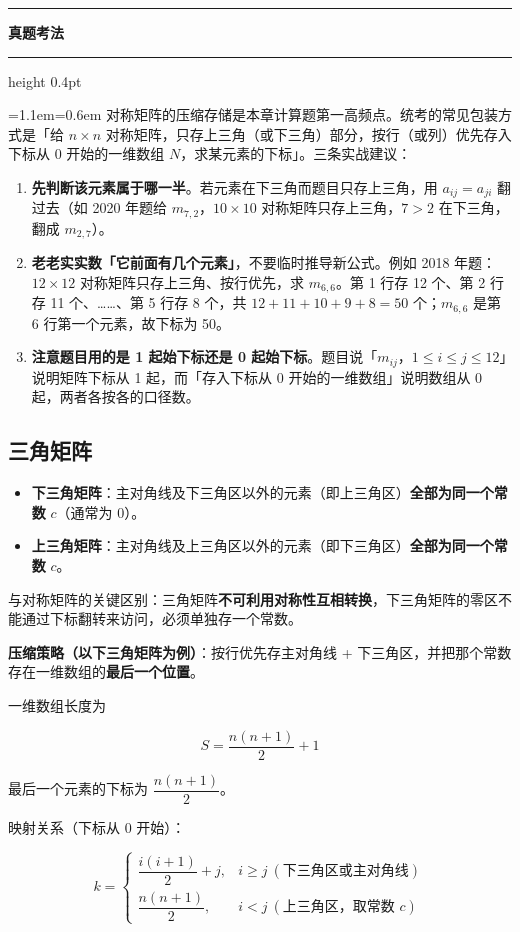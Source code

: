 \documentclass[11pt,openany,UTF8]{ctexbook}
\newcommand{\callouthead}[2]{%
  \par\addvspace{7pt}\noindent
  {\color{#1}\rule[-0.15em]{3pt}{1.05em}}\hspace{0.5em}%
  {\bfseries\color{#1}#2}\par\nobreak\vspace{-0.35em}%
  {\color{rulesep}\hrule height 0.4pt}\nobreak\vspace{0.45em}%
  \begingroup\small\setlength{\parindent}{0pt}%
  \leftskip=1.1em\rightskip=0.6em\noindent\ignorespaces}
\newcommand{\calloutend}{\par\endgroup\addvspace{7pt}}
\newenvironment{callexam}[1]{\callouthead{exambar}{#1}}{\calloutend}
\begin{document}
\begin{callexam}{真题考法}
对称矩阵的压缩存储是本章计算题第一高频点。统考的常见包装方式是「给 $n \times n$ 对称矩阵，只存上三角（或下三角）部分，按行（或列）优先存入下标从 0 开始的一维数组 $N$，求某元素的下标」。三条实战建议：

\begin{enumerate}
\item \textbf{先判断该元素属于哪一半}。若元素在下三角而题目只存上三角，用 $a_{ij} = a_{ji}$ 翻过去（如 2020 年题给 $m_{7,2}$，$10 \times 10$ 对称矩阵只存上三角，$7 > 2$ 在下三角，翻成 $m_{2,7}$）。
\item \textbf{老老实实数「它前面有几个元素」}，不要临时推导新公式。例如 2018 年题：$12 \times 12$ 对称矩阵只存上三角、按行优先，求 $m_{6,6}$。第 1 行存 12 个、第 2 行存 11 个、……、第 5 行存 8 个，共 $12+11+10+9+8 = 50$ 个；$m_{6,6}$ 是第 6 行第一个元素，故下标为 50。
\item \textbf{注意题目用的是 1 起始下标还是 0 起始下标}。题目说「$m_{ij}$，$1 \le i \le j \le 12$」说明矩阵下标从 1 起，而「存入下标从 0 开始的一维数组」说明数组从 0 起，两者各按各的口径数。
\end{enumerate}
\end{callexam}

\subsection{三角矩阵}

\begin{itemize}
\item \textbf{下三角矩阵}：主对角线及下三角区以外的元素（即上三角区）\textbf{全部为同一个常数} $c$（通常为 0）。
\item \textbf{上三角矩阵}：主对角线及上三角区以外的元素（即下三角区）\textbf{全部为同一个常数} $c$。
\end{itemize}
与对称矩阵的关键区别：三角矩阵\textbf{不可利用对称性互相转换}，下三角矩阵的零区不能通过下标翻转来访问，必须单独存一个常数。

\textbf{压缩策略（以下三角矩阵为例）}：按行优先存主对角线 + 下三角区，并把那个常数存在一维数组的\textbf{最后一个位置}。

一维数组长度为

\[S = \frac{n(n+1)}{2} + 1\]

最后一个元素的下标为 $\dfrac{n(n+1)}{2}$。

映射关系（下标从 0 开始）：

\[k = \begin{cases} \dfrac{i(i+1)}{2} + j, & i \ge j \ (\text{下三角区或主对角线}) \\[6pt] \dfrac{n(n+1)}{2}, & i < j \ (\text{上三角区，取常数 } c) \end{cases}\]
\end{document}
